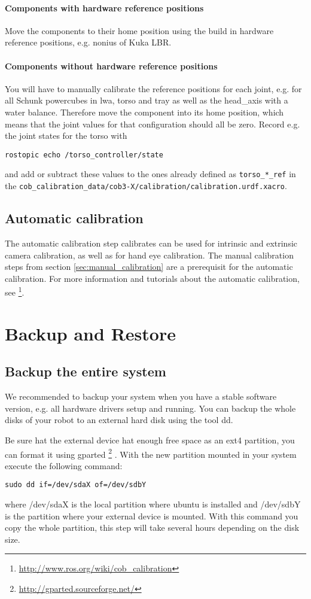 \paragraph{Components with hardware reference positions}
Move the components to their home position using the build in hardware reference positions, e.g. nonius of Kuka LBR.

\paragraph{Components without hardware reference positions}
You will have to manually calibrate the reference positions for each joint, e.g. for all Schunk powercubes in lwa, torso and tray as well as the head\_axis with a water balance. Therefore move the component into its home position, which means that the joint values for that configuration should all be zero. Record e.g. the joint states for the torso with
\begin{lstlisting}
rostopic echo /torso_controller/state
\end{lstlisting}
and add or subtract these values to the ones already defined as \texttt{torso\_*\_ref} in the \texttt{cob\_calibration\_data/cob3-X/calibration/calibration.urdf.xacro}.

\subsection{Automatic calibration}
The automatic calibration step calibrates can be used for intrinsic and extrinsic camera calibration, as well as for hand eye calibration. The manual calibration steps from section \ref{sec:manual_calibration} are a prerequisit for the automatic calibration. For more information and tutorials about the automatic calibration, see \footnote{\url{http://www.ros.org/wiki/cob_calibration}}.

\section{Backup and Restore} 
\subsection{Backup the entire system}  
We recommended to backup your system when you have a stable software version, e.g. all hardware drivers setup and running. You can backup the whole disks of your robot to an external hard disk using the tool dd.

Be sure hat the external device hat enough free space as an ext4 partition, you can format it using gparted \footnote{\url{http://gparted.sourceforge.net/}} . With the new partition mounted in your system execute the following command:
\begin{lstlisting}
sudo dd if=/dev/sdaX of=/dev/sdbY
\end{lstlisting}
where /dev/sdaX is the local partition where ubuntu is installed and /dev/sdbY is the partition where your external device is mounted. With this command you copy the whole partition, this step will take several hours depending on the disk size.

